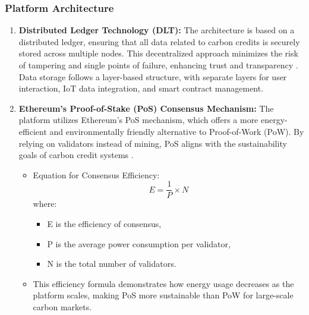 \documentclass[preprint,12pt]{elsarticle}
\begin{document}
\subsubsection{Platform Architecture}
\begin{enumerate}
    \item \textbf{Distributed Ledger Technology (DLT):}
The architecture is based on a distributed ledger, ensuring that all data related to carbon credits is securely stored across multiple nodes. This decentralized approach minimizes the risk of tampering and single points of failure, enhancing trust and transparency \citep{wood2014ethereum}. Data storage follows a layer-based structure, with separate layers for user interaction, IoT data integration, and smart contract management.
\item \textbf{Ethereum’s Proof-of-Stake (PoS) Consensus Mechanism:}
The platform utilizes Ethereum’s PoS mechanism, which offers a more energy-efficient and environmentally friendly alternative to Proof-of-Work (PoW). By relying on validators instead of mining, PoS aligns with the sustainability goals of carbon credit systems \citep{king2012ppcoin}.
\begin{itemize}
    \item Equation for Consensus Efficiency:
	\[E=\frac{1}{P}\times N\]
where:
\begin{itemize}
    \item E is the efficiency of consensus,
    \item P is the average power consumption per validator,
    \item N is the total number of validators.
\end{itemize}
    \item This efficiency formula demonstrates how energy usage decreases as the platform scales, making PoS more sustainable than PoW for large-scale carbon markets.
\end{itemize}
\end{enumerate}
\end{document}
